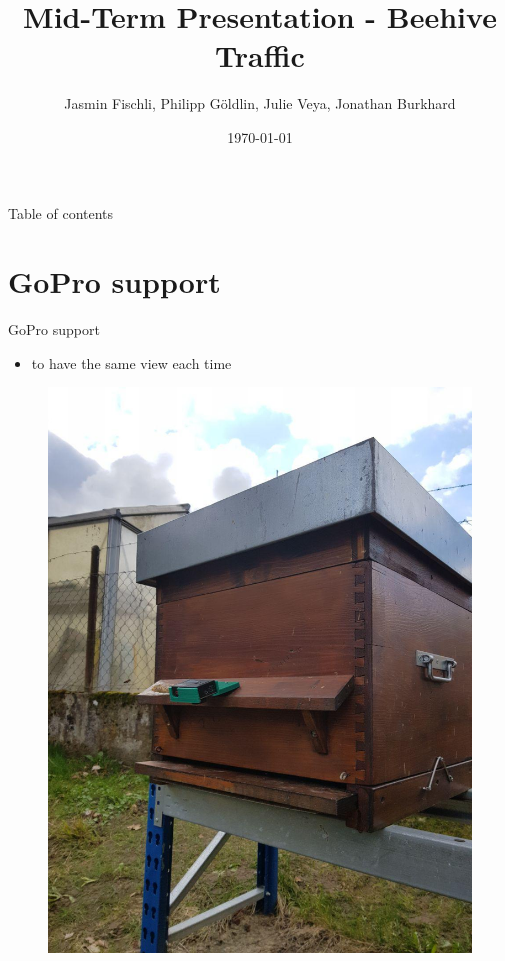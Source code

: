 \documentclass{beamer}
\author{Jasmin Fischli, Philipp Göldlin, Julie Veya, Jonathan Burkhard}
\title{Mid-Term Presentation - Beehive Traffic}
\date{\today}
\begin{document}
\frame{\maketitle}
\begin{frame}{Table of contents}{}
	\tableofcontents
\end{frame}

\section{GoPro support}
\begin{frame}{GoPro support}
\begin{itemize}
\item to have the same view each time
\end{itemize}
\begin{figure}
\includegraphics[scale=0.25]{pictures/photoSupport}

\end{figure}
\end{frame}
\end{document}
